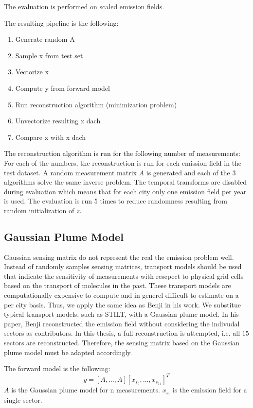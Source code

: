 The evaluation is performed on scaled emission fields.

The resulting pipeline is the following:
\begin{enumerate}
    \item Generate random A
    \item Sample x from test set
    \item Vectorize x
    \item Compute y from forward model
    \item Run reconstruction algorithm (minimization problem)
    \item Unvectorize resulting x dach
    \item Compare x with x dach
\end{enumerate}

The reconstruction algorithm is run for the following number of measurements:
For each of the numbers, the reconstruction is run for each emission field in the test dataset.
A random measurement matrix $A$ is generated and each of the $3$ algorithms solve the same inverse problem.
The temporal transforms are disabled during evaluation which means that for each city only one emission field per year is used.
The evaluation is run 5 times to reduce randomness resulting from random initialization of $z$.

\subsection{Gaussian Plume Model}
Gaussian sensing matrix do not represent the real the emission problem well.
Instead of randomly samples sensing matrices, transport models should be used that indicate the sensitivity of measurements with resepect to physical grid cells based on the transport of molecules in the past.
These transport models are computationally expensive to compute and in generel difficult to estimate on a per city basis.
Thus, we apply the same idea as Benji in his work.
We substitue typical transport models, such as STILT, with a Gaussian plume model.
In his paper, Benji reconstructed the emission field without considering the indivudal sectors as contributors.
In this thesis, a full reconstruction is attempted, i.e. all $15$ sectors are reconstructed.
Therefore, the sensing matrix based on the Gaussian plume model must be adapted accordingly.

The forward model is the following:
\begin{equation}
    y = [A, \dots, A] [x_{s_0}, \dots, x_{s_{14}}]^T
\end{equation}
$A$ is the Gaussian plume model for n measurements.
$x_{s_i}$ is the emission field for a single sector.

